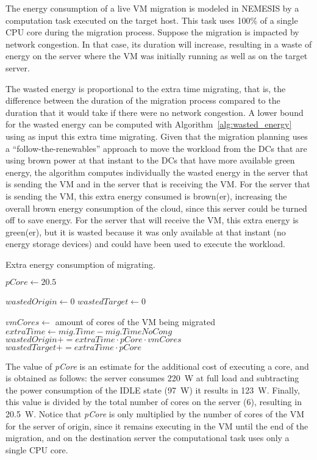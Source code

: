 The energy consumption of a live VM migration is modeled in NEMESIS by a computation task executed on the target host. This task uses 100\% of a single CPU core during the migration process. Suppose the migration is impacted by network congestion. In that case, its duration will increase, resulting in a waste of energy on the server where the VM was initially running as well as on the target server.


The wasted energy is proportional to the extra time migrating, that is, the difference between the duration of the migration process compared to the duration that it would take if there were no network congestion. A lower bound for the wasted energy can be computed with Algorithm~\ref{alg:wasted_energy} using as input this extra time migrating. Given that the migration planning uses a ``follow-the-renewables'' approach to move the workload from the DCs that are using brown power at that instant to the DCs that have more available green energy, the algorithm computes individually the wasted energy in the server that is sending the VM and in the server that is receiving the VM. For the server that is sending the VM, this extra energy consumed is brown(er), increasing the overall brown energy consumption of the cloud, since this server could be turned off to save energy. For the server that will receive the VM, this extra energy is green(er), but it is wasted because it was only available at that instant (no energy storage devices) and could have been used to execute the workload.

\begin{algorithm}[h]
\begin{algorithmic}
\caption{Extra energy consumption of migrating.}\label{alg:wasted_energy}

\State $pCore \gets 20.5$

\State $wastedOrigin \gets 0$
\State $wastedTarget \gets 0$

    \State $vmCores \gets$ amount of cores of the VM being migrated
    \State $extraTime \gets mig.Time - mig.TimeNoCong$
        \State $wastedOrigin += extraTime \cdot pCore \cdot vmCores$ 
        \State $wastedTarget += extraTime \cdot pCore$ 
    \EndIf
\EndFor
\end{algorithmic}
\end{algorithm}

The value of \textit{pCore} is an estimate for the additional cost of executing a core, and is obtained as follows: the server consumes \SI{220}{\watt} at full load and subtracting the power consumption of the IDLE state (\SI{97}{\watt}) it results in \SI{123}{\watt}. Finally, this value is divided by the total number of cores on the server (6), resulting in \SI{20.5}{\watt}. Notice that \textit{pCore} is only multiplied by the number of cores of the VM for the server of origin, since it remains executing in the VM until the end of the migration, and on the destination server the computational task uses only a single CPU core.

